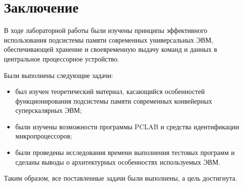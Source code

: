 \chapter*{Заключение}

В ходе лабораторной работы были изучены принципы эффективного использования
подсистемы памяти современных универсальных ЭВМ, обеспечивающей хранение и
своевременную выдачу команд и данных в центральное процессорное устройство.

Были выполнены следующие задачи:
\begin{itemize}
    \item был изучен теоретический материал, касающийся особенностей
          функционирования подсистемы памяти современных конвейерных
          суперскалярных ЭВМ;
    \item были изучены возможности программы PCLAB и средства идентификации
          микропроцессоров;
    \item были проведены исследования времени выполнения тестовых программ и
          сделаны выводы о архитектурных особенностях используемых ЭВМ.
\end{itemize}

Таким образом, все поставленные задачи были выполнены, а цель достигнута.
